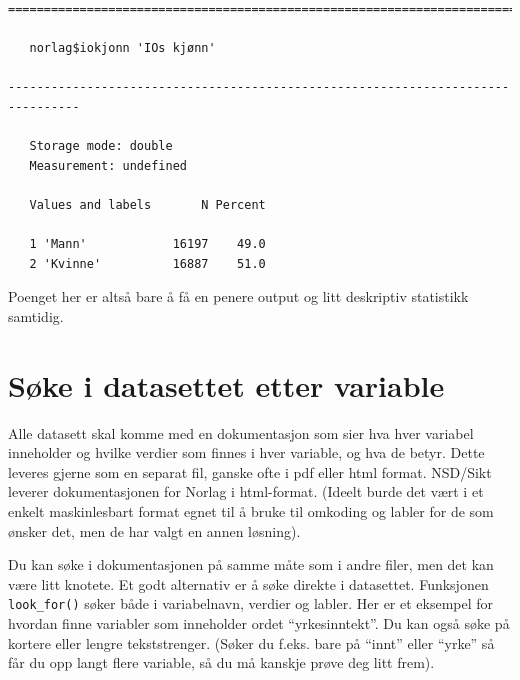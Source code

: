 \documentclass[
  letterpaper,
  DIV=11,
  numbers=noendperiod]{scrreprt}
\newenvironment{Shaded}{\begin{snugshade}}{\end{snugshade}}
\newcommand{\FunctionTok}[1]{\textcolor[rgb]{0.28,0.35,0.67}{#1}}
\newcommand{\NormalTok}[1]{\textcolor[rgb]{0.00,0.23,0.31}{#1}}
\newcommand{\SpecialCharTok}[1]{\textcolor[rgb]{0.37,0.37,0.37}{#1}}
\begin{document}
\begin{Shaded}
\end{Shaded}

\begin{verbatim}
================================================================================

   norlag$iokjonn 'IOs kjønn'

--------------------------------------------------------------------------------

   Storage mode: double
   Measurement: undefined

   Values and labels       N Percent
                                    
   1 'Mann'            16197    49.0
   2 'Kvinne'          16887    51.0
\end{verbatim}

Poenget her er altså bare å få en penere output og litt deskriptiv
statistikk samtidig.

\hypertarget{suxf8ke-i-datasettet-etter-variable}{%
\section{Søke i datasettet etter
variable}\label{suxf8ke-i-datasettet-etter-variable}}

Alle datasett skal komme med en dokumentasjon som sier hva hver variabel
inneholder og hvilke verdier som finnes i hver variable, og hva de
betyr. Dette leveres gjerne som en separat fil, ganske ofte i pdf eller
html format. NSD/Sikt leverer dokumentasjonen for Norlag i html-format.
(Ideelt burde det vært i et enkelt maskinlesbart format egnet til å
bruke til omkoding og labler for de som ønsker det, men de har valgt en
annen løsning).

Du kan søke i dokumentasjonen på samme måte som i andre filer, men det
kan være litt knotete. Et godt alternativ er å søke direkte i
datasettet. Funksjonen \texttt{look\_for()} søker både i variabelnavn,
verdier og labler. Her er et eksempel for hvordan finne variabler som
inneholder ordet ``yrkesinntekt''. Du kan også søke på kortere eller
lengre tekststrenger. (Søker du f.eks. bare på ``innt'' eller ``yrke''
så får du opp langt flere variable, så du må kanskje prøve deg litt
frem).
\end{document}
